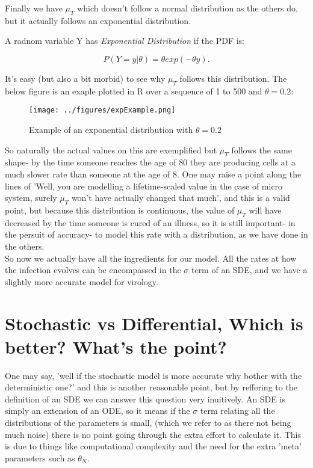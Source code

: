 Finally we have $\mu_T$ which doesn't follow a normal distribution as the others do, but it actually follows an exponential distribution.

\begin{definition}
    A radnom variable Y has \textit{Exponential Distribution} if the PDF is:

    \[
        P(Y=y | \theta) = \theta exp(-\theta y)
    .\] 
\end{definition}

It's easy (but also a bit morbid) to see why $\mu_T$ follows this distribution. The below figure is an exaple plotted in R over a sequence of 1 to 500 and $\theta = 0.2$:

\begin{figure}[h]
    \centering
    \texttt{[image: ../figures/expExample.png]}
    \caption{Example of an exponential distribution with $\theta=0.2$}
\end{figure}

So naturally the actual values on this are exemplified but $\mu_T$ follows the same shape- by the time someone reaches the age of 80 they are producing cells at a much slower rate than someone at the age of 8. One may raise a point along the lines of 'Well, you are modelling a lifetime-scaled value in the case of micro system, surely $\mu_T$ won't have actually changed that much', and this is a valid point, but because this distribution is continuous, the value of $\mu_T$ will have decreased by the time someone is cured of an illness, so it is still important- in the persuit of accuracy- to model this rate with a distribution, as we have done in the others. \\

So now we actually have all the ingredients for our model. All the rates at how the infection evolves can be encompassed in the  $\sigma$ term of an SDE, and we have a slightly more accurate model for virology. \\

\section{Stochastic vs Differential, Which is better? What's the point?}

One may say, 'well if the stochastic model is more accurate why bother with the deterministic one?' and this is another reasonable point, but by reffering to the definition of an SDE we can answer this question very inuitively. An SDE is simply an extension of an ODE, so it means if the $\sigma$ term relating all the distributions of the parameters is small, (which we refer to as there not being much noise) there is no point going through the extra effort to calculate it. This is due to things like computational complexity and the need for the extra 'meta' parameters such as  $\theta_N$. \\ 

